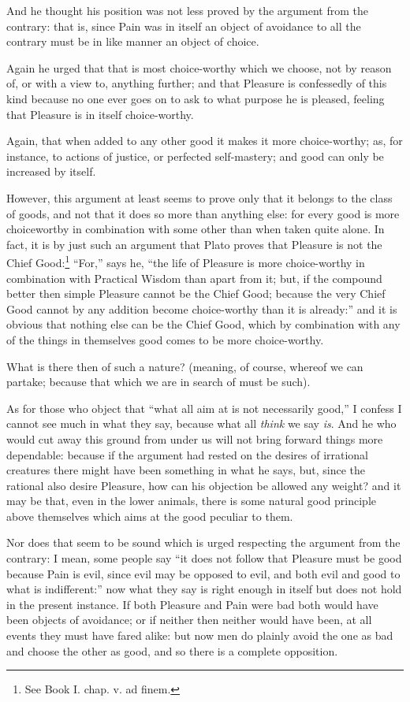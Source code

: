 And he thought his position was not less proved by the argument from the
contrary: that is, since Pain was in itself an object of avoidance to all the
contrary must be in like manner an object of choice.

Again he urged that that is most choice-worthy which we choose, not by reason
of, or with a view to, anything further; and that Pleasure is confessedly of
this kind because no one ever goes on to ask to what purpose he is pleased,
feeling that Pleasure is in itself choice-worthy.

Again, that when added to any other good it makes it more choice-worthy; as,
for instance, to actions of justice, or perfected self-mastery; and good can
only be increased by itself.

However, this argument at least seems to prove only that it belongs to the
class of goods, and not that it does so more than anything else: for every good
is more choicewortby in combination with some other than when taken quite
alone. In fact, it is by just such an argument that Plato proves that Pleasure
is not the Chief Good:\footnote{See Book I. chap. v. ad finem.}
“For,” says he, “the life of Pleasure is more choice-worthy
in combination with Practical Wisdom than apart from it; but, if the compound
better then simple Pleasure cannot be the Chief Good; because the very Chief
Good cannot by any addition become choice-worthy than it is already:” and
it is obvious that nothing else can be the Chief Good, which by combination
with any of the things in themselves good comes to be more choice-worthy.

What is there then of such a nature? (meaning, of course, whereof we can
partake; because that which we are in search of must be such).

As for those who object that “what all aim at is not necessarily
good,” I confess I cannot see much in what they say, because what all
\emph{think} we say \emph{is}. And he who would cut away this ground from under
us will not bring forward things more dependable: because if the argument had
rested on the desires of irrational creatures there might have been something
in what he says, but, since the rational also desire Pleasure, how can his
objection be allowed any weight? and it may be that, even in the lower animals,
there is some natural good principle above themselves which aims at the good
peculiar to them.

Nor does that seem to be sound which is urged respecting the argument from the
contrary: I mean, some people say “it does not follow that Pleasure must
be good because Pain is evil, since evil may be opposed to evil, and both evil
and good to what is indifferent:” now what they say is right enough in
itself but does not hold in the present instance. If both Pleasure and Pain
were bad both would have been objects of avoidance; or if neither then neither
would have been, at all events they must have fared alike: but now men do
plainly avoid the one as bad and choose the other as good, and so there is a
complete opposition.

